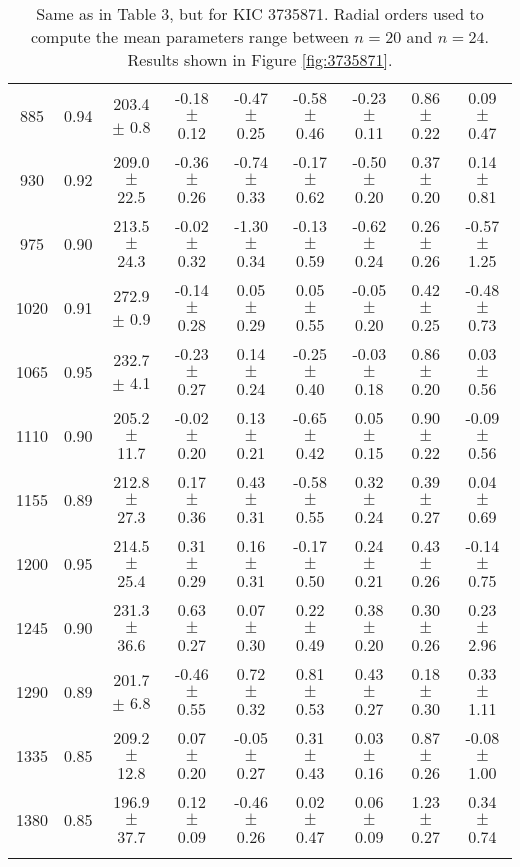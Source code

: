 \documentclass[twocolumn]{aastex61}%
\begin{document}
\begin{table*}[ht]
\begin{tabular}{ccc|ccccc|c}
885 & 0.94 & 203.4 $\pm$ 0.8 & -0.18 $\pm$ 0.12 & -0.47 $\pm$ 0.25 & -0.58 $\pm$ 0.46 & -0.23 $\pm$ 0.11 & 0.86 $\pm$ 0.22 & 0.09 $\pm$ 0.47\\
930 & 0.92 & 209.0 $\pm$ 22.5 & -0.36 $\pm$ 0.26 & -0.74 $\pm$ 0.33 & -0.17 $\pm$ 0.62 & -0.50 $\pm$ 0.20 & 0.37 $\pm$ 0.20 & 0.14 $\pm$ 0.81\\
975 & 0.90 & 213.5 $\pm$ 24.3 & -0.02 $\pm$ 0.32 & -1.30 $\pm$ 0.34 & -0.13 $\pm$ 0.59 & -0.62 $\pm$ 0.24 & 0.26 $\pm$ 0.26 & -0.57 $\pm$ 1.25\\
1020 & 0.91 & 272.9 $\pm$ 0.9 & -0.14 $\pm$ 0.28 & 0.05 $\pm$ 0.29 & 0.05 $\pm$ 0.55 & -0.05 $\pm$ 0.20 & 0.42 $\pm$ 0.25 & -0.48 $\pm$ 0.73\\
1065 & 0.95 & 232.7 $\pm$ 4.1 & -0.23 $\pm$ 0.27 & 0.14 $\pm$ 0.24 & -0.25 $\pm$ 0.40 & -0.03 $\pm$ 0.18 & 0.86 $\pm$ 0.20 & 0.03 $\pm$ 0.56\\
1110 & 0.90 & 205.2 $\pm$ 11.7 & -0.02 $\pm$ 0.20 & 0.13 $\pm$ 0.21 & -0.65 $\pm$ 0.42 & 0.05 $\pm$ 0.15 & 0.90 $\pm$ 0.22 & -0.09 $\pm$ 0.56\\
1155 & 0.89 & 212.8 $\pm$ 27.3 & 0.17 $\pm$ 0.36 & 0.43 $\pm$ 0.31 & -0.58 $\pm$ 0.55 & 0.32 $\pm$ 0.24 & 0.39 $\pm$ 0.27 & 0.04 $\pm$ 0.69\\
1200 & 0.95 & 214.5 $\pm$ 25.4 & 0.31 $\pm$ 0.29 & 0.16 $\pm$ 0.31 & -0.17 $\pm$ 0.50 & 0.24 $\pm$ 0.21 & 0.43 $\pm$ 0.26 & -0.14 $\pm$ 0.75\\
1245 & 0.90 & 231.3 $\pm$ 36.6 & 0.63 $\pm$ 0.27 & 0.07 $\pm$ 0.30 & 0.22 $\pm$ 0.49 & 0.38 $\pm$ 0.20 & 0.30 $\pm$ 0.26 & 0.23 $\pm$ 2.96\\
1290 & 0.89 & 201.7 $\pm$ 6.8 & -0.46 $\pm$ 0.55 & 0.72 $\pm$ 0.32 & 0.81 $\pm$ 0.53 & 0.43 $\pm$ 0.27 & 0.18 $\pm$ 0.30 & 0.33 $\pm$ 1.11\\
1335 & 0.85 & 209.2 $\pm$ 12.8 & 0.07 $\pm$ 0.20 & -0.05 $\pm$ 0.27 & 0.31 $\pm$ 0.43 & 0.03 $\pm$ 0.16 & 0.87 $\pm$ 0.26 & -0.08 $\pm$ 1.00\\
1380 & 0.85 & 196.9 $\pm$ 37.7 & 0.12 $\pm$ 0.09 & -0.46 $\pm$ 0.26 & 0.02 $\pm$ 0.47 & 0.06 $\pm$ 0.09 & 1.23 $\pm$ 0.27 & 0.34 $\pm$ 0.74\\\vspace{-0.35cm}
\end{tabular}
\caption{Same as in Table 3, but for KIC 3735871. Radial orders used to compute the mean parameters range between $n=20$ and $n=24$. Results shown in Figure \ref{fig:3735871}.}\label{tab:3735871}\vspace{-0.2cm}
\end{table*}
\end{document}
